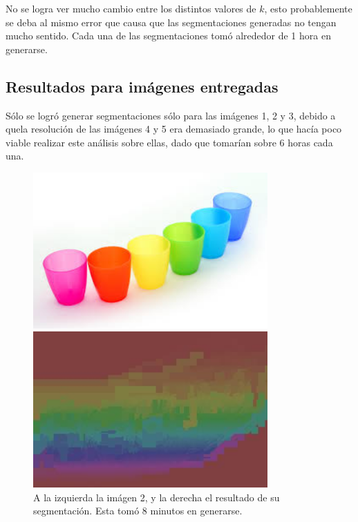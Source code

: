 \documentclass[letterpaper,11pt]{article} %
\begin{document}
    No se logra ver mucho cambio entre los distintos valores de $k$, esto probablemente se deba al mismo error que causa que las segmentaciones generadas no tengan mucho sentido. Cada una de las segmentaciones tomó alrededor de 1 hora en generarse.

  \subsection{Resultados para imágenes entregadas}
    Sólo se logró generar segmentaciones sólo para las imágenes 1, 2 y 3, debido a quela resolución de las imágenes 4 y 5 era demasiado grande, lo que hacía poco viable realizar este análisis sobre ellas, dado que tomarían sobre 6 horas cada una.

    \begin{figure}[H]
      \centering
      \begin{minipage}{0.4\textwidth}
        \includegraphics[width=0.8\textwidth]{images/image_2}
      \end{minipage}
      \begin{minipage}{0.4\textwidth}
        \includegraphics[width=0.8\textwidth]{images/result_image2}
      \end{minipage}
      \caption{A la izquierda la imágen 2, y la derecha el resultado de su segmentación. Esta tomó 8 minutos en generarse.}
    \end{figure}
\end{document}
